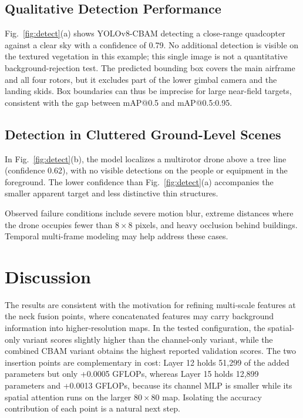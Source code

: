 \documentclass[conference]{IEEEtran}
\begin{document}
\subsection{Qualitative Detection Performance}

Fig.~\ref{fig:detect}(a) shows YOLOv8-CBAM detecting a close-range quadcopter against a clear sky with a confidence of 0.79. No additional detection is visible on the textured vegetation in this example; this single image is not a quantitative background-rejection test. The predicted bounding box covers the main airframe and all four rotors, but it excludes part of the lower gimbal camera and the landing skids. Box boundaries can thus be imprecise for large near-field targets, consistent with the gap between mAP@0.5 and mAP@0.5:0.95.



\subsection{Detection in Cluttered Ground-Level Scenes}

In Fig.~\ref{fig:detect}(b), the model localizes a multirotor drone above a tree line (confidence 0.62), with no visible detections on the people or equipment in the foreground. The lower confidence than Fig.~\ref{fig:detect}(a) accompanies the smaller apparent target and less distinctive thin structures.

Observed failure conditions include severe motion blur, extreme distances where the drone occupies fewer than $8\times8$ pixels, and heavy occlusion behind buildings. Temporal multi-frame modeling may help address these cases.

\section{Discussion}

The results are consistent with the motivation for refining multi-scale features at the neck fusion points, where concatenated features may carry background information into higher-resolution maps. In the tested configuration, the spatial-only variant scores slightly higher than the channel-only variant, while the combined CBAM variant obtains the highest reported validation scores. The two insertion points are complementary in cost: Layer 12 holds 51,299 of the added parameters but only +0.0005 GFLOPs, whereas Layer 15 holds 12,899 parameters and +0.0013 GFLOPs, because its channel MLP is smaller while its spatial attention runs on the larger $80\times80$ map. Isolating the accuracy contribution of each point is a natural next step.
\end{document}
